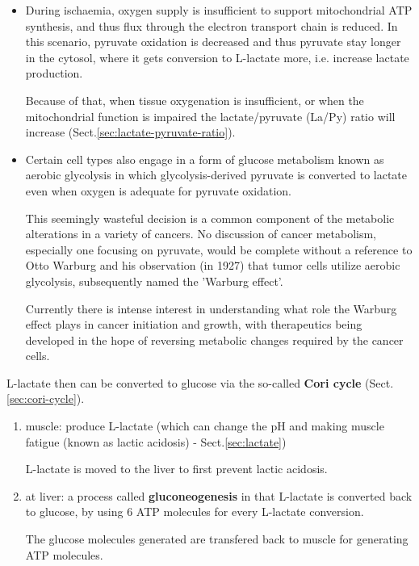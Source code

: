 \begin{itemize}
  \item  During ischaemia, oxygen supply is insufficient to support
  mitochondrial ATP synthesis, and thus flux through the electron transport chain is reduced. In
this scenario, pyruvate oxidation is decreased and thus pyruvate stay longer
in the cytosol, where it gets conversion to L-lactate more, i.e. increase
lactate production.

Because of that, when tissue oxygenation is insufficient, or when the
mitochondrial function is impaired the lactate/pyruvate (La/Py) ratio will
increase (Sect.\ref{sec:lactate-pyruvate-ratio}).

  \item Certain cell types also engage in a form of glucose metabolism known as
  aerobic glycolysis in which glycolysis-derived pyruvate is converted to
  lactate even when oxygen is adequate for pyruvate oxidation.
  
This seemingly wasteful decision is a common component of the metabolic
alterations in a variety of cancers. 
No discussion of cancer metabolism, especially one focusing on pyruvate, would
be complete without a reference to Otto Warburg and his observation (in
1927) that tumor cells utilize aerobic glycolysis, subsequently named the
'Warburg effect'.

Currently there is intense interest in understanding what role the Warburg
effect plays in cancer initiation and growth, with therapeutics being developed
in the hope of reversing metabolic changes required by the cancer cells.
\end{itemize}

L-lactate then can be converted to glucose via the so-called {\bf Cori cycle}
(Sect.\ref{sec:cori-cycle}).

\begin{enumerate}
  \item muscle: produce L-lactate (which can change the pH and making muscle
  fatigue (known as lactic acidosis) - Sect.\ref{sec:lactate})
  
L-lactate is moved to the liver to first prevent lactic acidosis.

  \item at liver: a process called {\bf gluconeogenesis} in that L-lactate is
  converted back to glucose, by using 6 ATP molecules for every L-lactate
  conversion.

The glucose molecules generated are transfered back to muscle for generating
ATP molecules.
\end{enumerate}

